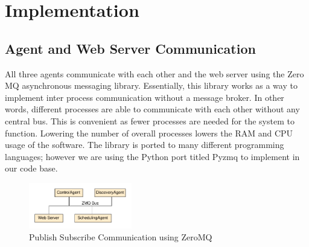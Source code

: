 \chapter{Implementation}
\label{ch: Chapter3}

\section{Agent and Web Server Communication}

All three agents communicate with each other and the web server using the Zero
MQ asynchronous messaging library. Essentially, this library
works as a way to implement inter process communication without a message
broker. In other words, different processes are able to communicate with each
other without any central bus. This is convenient as fewer processes are needed
for the system to function. Lowering the number of overall processes lowers the
RAM and CPU usage of the software. The library is ported to many different
programming languages; however we are using the Python port titled Pyzmq to
implement in our code base.
%
\begin{figure}
    \centering
    \includegraphics[width=0.4\textwidth]{figs/pubSubAgents.pdf}
    \caption{Publish Subscribe Communication using ZeroMQ}
    \label{fig:pubSubAgents}
\end{figure}
%

